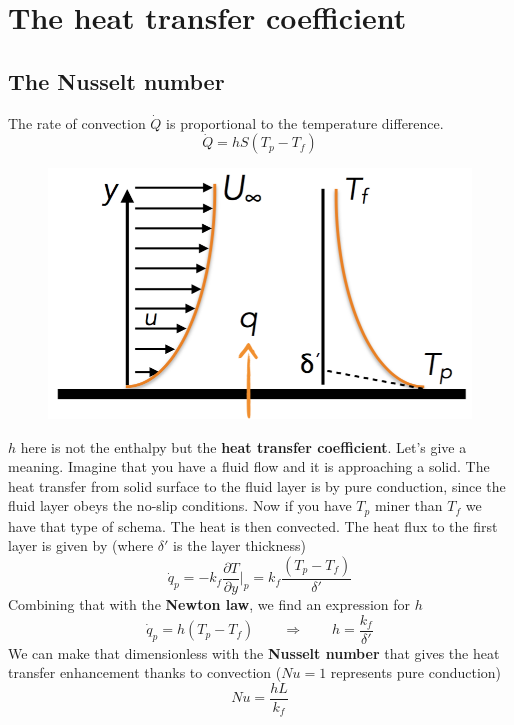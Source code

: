 \section{The heat transfer coefficient}
	\subsection{The Nusselt number}
	\label{subsec:5.3.1}
	The rate of convection $\dot{Q}$ is proportional to the temperature difference. 
	\begin{equation}
		\dot{Q} = h S(T_p - T_f)
	\end{equation}		
	\begin{figure}
	\vspace{-15mm}
	\includegraphics[scale=0.25]{ch5/3}
	\end{figure}	
	$h$ here is not the enthalpy but the \textbf{heat transfer coefficient}. Let's give a meaning. Imagine that you have a fluid flow and it is approaching a solid. The heat transfer from solid surface to the fluid layer is by pure conduction, since the fluid layer obeys the no-slip conditions. Now if you have $T_p$ miner than $T_f$ we have that type of schema. The heat is then convected. The heat flux to the first layer is given by (where $\delta '$ is the layer thickness)
	\begin{equation}
		\dot{q}_p = -k_f \frac{\partial T}{\partial y}|_p = k_f\frac{(T_p-T_f)}{\delta '}
	\end{equation}
	Combining that with the \textbf{Newton law}, we find an expression for $h$
	\begin{equation}
		\dot{q}_p = h(T_p-T_f) \qquad \Rightarrow \qquad h = \frac{k_f}{\delta '}
	\end{equation}
 	We can make that dimensionless with the \textbf{Nusselt number} that gives the heat transfer enhancement thanks to convection ($Nu = 1$ represents pure conduction)
 	\begin{equation}
 		Nu = \frac{hL}{k_f}
 	\end{equation}
	
